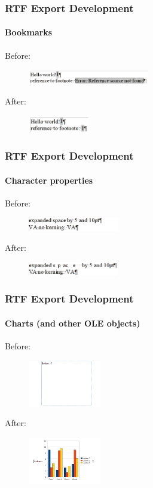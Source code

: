 \documentclass[hyperref={pdfpagelabels=false}]{beamer}
\begin{document}
\begin{frame}
\frametitle{RTF Export Development}
\framesubtitle{Bookmarks}
Before:
\begin{figure}[H]
\includegraphics[width=200px,keepaspectratio]{pic/bookmark-old.png}
\end{figure}
After:
\begin{figure}[H]
\includegraphics[width=100px,keepaspectratio]{pic/bookmark-new.png}
\end{figure}
\end{frame}

\begin{frame}
\frametitle{RTF Export Development}
\framesubtitle{Character properties}
Before:
\begin{figure}[H]
\includegraphics[width=150px,keepaspectratio]{pic/charprops-old.png}
\end{figure}
After:
\begin{figure}[H]
\includegraphics[width=150px,keepaspectratio]{pic/charprops-new.png}
\end{figure}
\end{frame}

\begin{frame}
\frametitle{RTF Export Development}
\framesubtitle{Charts (and other OLE objects)}
Before:
\begin{figure}[H]
\includegraphics[width=120px,keepaspectratio]{pic/chart-old.png}
\end{figure}
After:
\begin{figure}[H]
\includegraphics[width=120px,keepaspectratio]{pic/chart-new.png}
\end{figure}
\end{frame}
\end{document}
